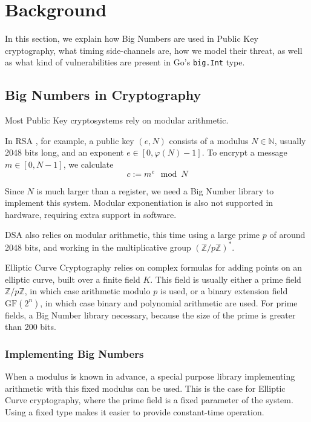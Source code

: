 \documentclass[11pt, a4paper]{article} %
\begin{document}
{\section{Background}

In this section, we explain how Big Numbers are used in Public Key
cryptography, what timing side-channels are, how we model their threat,
as well as what kind of vulnerabilities are present in Go's
\texttt{big.Int} type.

\subsection{Big Numbers in Cryptography}

Most Public Key cryptosystems rely on
modular arithmetic.

In RSA \cite{rivest_method_1978}, for example, a public key $(e, N)$ consists
of a modulus
$N \in \mathbb{N}$, usually 2048 bits long, and an exponent $e
\in [0, \varphi(N) - 1]$.
To encrypt a message $m \in [0, N - 1]$, we calculate
$$
c := m^e \mod N
$$

Since $N$ is much larger than a register, 
we need a Big Number library to implement this system.
Modular exponentiation is also not supported in hardware,
requiring extra support in software.

DSA
\cite{technology_digital_1994} also relies on modular arithmetic,
this time using a large prime $p$ of around 2048 bits, and working
in the multiplicative group $(\mathbb{Z}/p\mathbb{Z})^*$.

Elliptic Curve Cryptography
\cite{miller_use_1986} relies on complex formulas for adding points
on an elliptic curve, built over a finite field $K$. This field
is usually either a prime field $\mathbb{Z}/p\mathbb{Z}$, in which case arithmetic
modulo $p$ is used, or a
binary extension field $\text{GF}(2^n)$, in which case
binary and polynomial arithmetic are used.
For prime fields, a Big Number library necessary, because
the size of the prime is greater than 200 bits.

\subsubsection{Implementing Big Numbers}

When a modulus is known in advance, a special purpose
library implementing arithmetic with this fixed modulus
can be used. This is the case for Elliptic Curve cryptography,
where the prime field is a fixed parameter of the system.
Using a fixed type makes it easier to provide constant-time operation.

}
\end{document}
